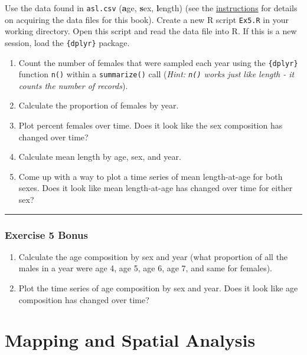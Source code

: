\documentclass[]{book}
\providecommand{\tightlist}{%
  \setlength{\itemsep}{0pt}\setlength{\parskip}{0pt}}
\theoremstyle{definition}
\theoremstyle{definition}
\theoremstyle{definition}
\theoremstyle{remark}
\begin{document}
Use the data found in \texttt{asl.csv} (\textbf{a}ge, \textbf{s}ex,
\textbf{l}ength) (see the \protect\hyperlink{data-sets}{instructions}
for details on acquiring the data files for this book). Create a new R
script \texttt{Ex5.R} in your working directory. Open this script and
read the data file into R. If this is a new session, load the
\texttt{\{dplyr\}} package.

\begin{enumerate}
\def\labelenumi{\arabic{enumi}.}
\tightlist
\item
  Count the number of females that were sampled each year using the
  \texttt{\{dplyr\}} function \texttt{n()} within a \texttt{summarize()}
  call (\emph{Hint: \texttt{n()} works just like length - it counts the
  number of records}).
\item
  Calculate the proportion of females by year.
\item
  Plot percent females over time. Does it look like the sex composition
  has changed over time?
\item
  Calculate mean length by age, sex, and year.
\item
  Come up with a way to plot a time series of mean length-at-age for
  both sexes. Does it look like mean length-at-age has changed over time
  for either sex?
\end{enumerate}

\begin{center}\rule{0.5\linewidth}{\linethickness}\end{center}

\subsection*{Exercise 5 Bonus}\label{exercise-5-bonus}

\begin{enumerate}
\def\labelenumi{\arabic{enumi}.}
\tightlist
\item
  Calculate the age composition by sex and year (what proportion of all
  the males in a year were age 4, age 5, age 6, age 7, and same for
  females).
\item
  Plot the time series of age composition by sex and year. Does it look
  like age composition has changed over time?
\end{enumerate}

\chapter{Mapping and Spatial Analysis}\label{ch6}
\end{document}
